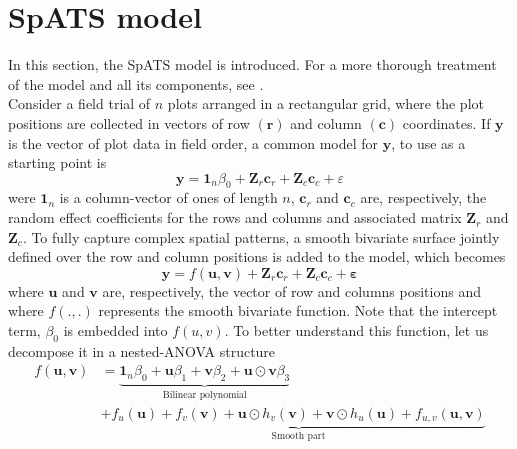 \section{SpATS model}
In this section, the SpATS model is introduced. For a more thorough treatment of the model and all its components, see \textcite{rodriguez-alvarez_spatial_2016}.\\
Consider a field trial of $n$ plots arranged in a rectangular grid, where the plot positions are collected in vectors of row $(\mathbf{r})$ and column $(\mathbf{c})$ coordinates. If $\mathbf{y}$ is the vector of plot data in field order, a common model for $\mathbf{y}$, to use as a starting point is
	\begin{equation}
	    \boldsymbol{y}=\mathbf{1}_{n} \beta_{0}+\boldsymbol{Z}_{r} \boldsymbol{c}_{r}+\boldsymbol{Z}_{c} \boldsymbol{c}_{c}
	    +\varepsilon
	\end{equation}
were $\mathbf{1}_{n}$ is a column-vector of ones of length $n$, $\boldsymbol{c}_{r}$ and $\boldsymbol{c}_{c}$ are, respectively, the random effect coefficients for the rows and columns and associated matrix $\boldsymbol{Z}_{r}$ and $\boldsymbol{Z}_{c}$. To fully capture complex spatial patterns, a smooth bivariate surface jointly defined over the row and column positions is added to the model, which becomes
	\begin{equation}
	    \boldsymbol{y}=f(\boldsymbol{u}, \boldsymbol{v})+\boldsymbol{Z}_{r} \boldsymbol{c}_{r}+\boldsymbol{Z}_{c} \boldsymbol{c}
	    _{c}+\boldsymbol{\varepsilon}
	    \label{eq:base_model_bismooth_surface}
	\end{equation}
where $\mathbf{u}$ and $\mathbf{v}$ are, respectively, the vector of row and columns positions and where $f(.,.)$ represents the smooth bivariate function. Note that the intercept term, $\beta_0$ is embedded into $f(u,v)$. To better understand this function, let us decompose it in a nested-ANOVA structure
	\begin{align}
	f ( \boldsymbol { u } , \boldsymbol { v } ) & = \underbrace { \mathbf { 1 } _ { n } \beta _ { 0 } + \boldsymbol { u } \beta
	 _ { 1 } + \boldsymbol { v } \beta _ { 2 } + \boldsymbol { u } \odot \boldsymbol { v } \beta _ { 3 } } _ { \text { Bilinear
	  polynomial } } \nonumber \\
	 & + \underbrace { f _ { u } ( \boldsymbol { u } ) + f _ { v } ( \boldsymbol { v } ) + \boldsymbol { u } \odot h _ { v } (
	  \boldsymbol { v } ) + \boldsymbol { v } \odot h _ { u } ( \boldsymbol { u } ) + f _ { u , v } ( \boldsymbol { u } ,
	   \boldsymbol { v } ) }_{\text{Smooth part}}
	 \label{eq:full_bivariate_smooth_surface_model}
	\end{align}
